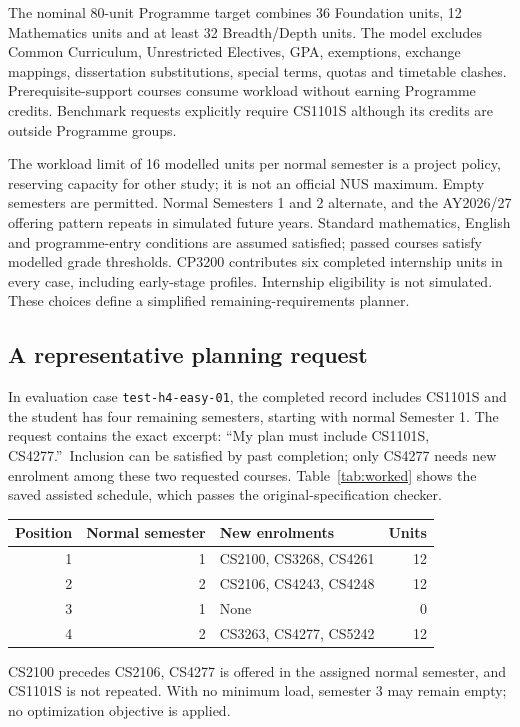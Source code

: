 \documentclass[11pt,a4paper]{article}
\newcommand{\code}[1]{\texttt{#1}}
\begin{document}
The nominal 80-unit Programme target combines 36 Foundation units,
12 Mathematics units and at least 32 Breadth/Depth units. The model excludes Common
Curriculum, Unrestricted Electives, GPA, exemptions, exchange mappings,
dissertation substitutions, special terms, quotas and timetable clashes.
Prerequisite-support courses consume workload without earning Programme
credits. Benchmark requests explicitly require CS1101S although its credits
are outside Programme groups.

The workload limit of 16 modelled units per normal semester is a project
policy, reserving capacity for other study; it is not an official NUS maximum.
Empty semesters are permitted. Normal Semesters 1 and 2 alternate, and the
AY2026/27 offering pattern repeats in simulated future years. Standard
mathematics, English and programme-entry conditions are assumed satisfied;
passed courses satisfy modelled grade thresholds. CP3200 contributes six
completed internship units in every case, including early-stage profiles.
Internship eligibility is not simulated. These choices define a simplified
remaining-requirements planner.

\subsection{A representative planning request}
In evaluation case \code{test-h4-easy-01}, the completed record includes
CS1101S and the student has four remaining semesters, starting with normal
Semester 1. The request contains the exact excerpt:
\textquotedblleft My plan must include CS1101S, CS4277.\textquotedblright\
Inclusion can be satisfied by past completion; only CS4277 needs new
enrolment among these two requested courses. Table~\ref{tab:worked} shows the
saved assisted schedule, which passes the original-specification checker.

\begin{center}
\begin{minipage}{\linewidth}
\centering
{}
\label{tab:worked}
\begin{tabularx}{\linewidth}{@{}rrYr@{}}
\toprule
Position & Normal semester & New enrolments & Units\\
 & 1 & CS2100, CS3268, CS4261 & 12\\
2 & 2 & CS2106, CS4243, CS4248 & 12\\
3 & 1 & None & 0\\
4 & 2 & CS3263, CS4277, CS5242 & 12\\
\bottomrule
\end{tabularx}
\end{minipage}
\end{center}
CS2100 precedes CS2106, CS4277 is offered in the assigned normal semester,
and CS1101S is not repeated. With no minimum load, semester 3 may remain
empty; no optimization objective is applied.
\end{document}
